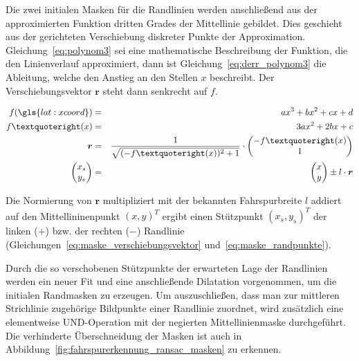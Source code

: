 Die zwei initialen Masken für die Randlinien werden anschließend aus der approximierten Funktion dritten Grades der Mittellinie gebildet. Dies geschieht aus der gerichteten Verschiebung diskreter Punkte der Approximation. Gleichung~\ref{eq:polynom3} sei eine mathematische Beschreibung der Funktion, die den Linienverlauf approximiert, dann ist Gleichung~\ref{eq:derr_polynom3} die Ableitung, welche den Anstieg an den Stellen \( x \) beschreibt. Der Verschiebungsvektor \( \boldsymbol{r} \) steht dann senkrecht auf \( f \).

\begin{eqnarray}
f(\gls{lat:xcoord}) & = & ax^3 + bx^2 +cx +d  \label{eq:polynom3} 	\\
f’(x) & = & 3ax^2 + 2bx +c \label{eq:derr_polynom3} 							\\
\boldsymbol{r} & = & \frac{1}{\sqrt{(-f’(x))^2 + 1}} \cdot
\begin{pmatrix}
-f’(x) 	\\
1 		\\
\end{pmatrix}
\label{eq:maske_verschiebungsvektor}									\\
\begin{pmatrix}
x_s 	\\
y_s	\\
\end{pmatrix}
 & = & 
 \begin{pmatrix}
x 	\\
y	\\
\end{pmatrix}
\pm l \cdot \boldsymbol{r}  
\label{eq:maske_randpunkte}
\end{eqnarray}

Die Normierung von \( \boldsymbol{r} \) multipliziert mit der bekannten Fahrspurbreite \( l \) addiert auf den Mittellininenpunkt \( (x,y)^T \) ergibt einen Stützpunkt \( (x_s,y_s)^T \) der linken (\( + \)) bzw. der rechten (\( - \)) Randlinie (Gleichungen~\ref{eq:maske_verschiebungsvektor} und~\ref{eq:maske_randpunkte}).

Durch die so verschobenen Stützpunkte der erwarteten Lage der Randlinien werden ein neuer Fit und eine anschließende Dilatation vorgenommen, um die initialen Randmasken zu erzeugen. Um auszuschließen, dass man zur mittleren Strichlinie zugehörige Bildpunkte einer Randlinie zuordnet, wird zusätzlich eine elementweise UND-Operation mit der negierten Mittellinienmaske durchgeführt. Die verhinderte Überschneidung der Masken ist auch in Abbildung~\ref{fig:fahrspurerkennung_ransac_masken} zu erkennen.

